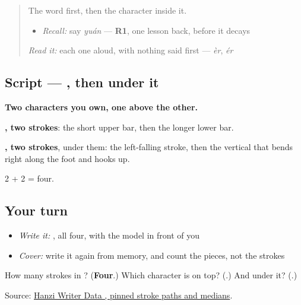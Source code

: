 \label{lesson:ZH-W156-yuan-money}



\begin{quote}
The word first, then the character inside it.

\begin{itemize}
\raggedright
  \item \emph{Recall:} say \emph{yuán} — \textbf{R1}, one lesson back, before it decays
\end{itemize}

\begin{quote}
 
\end{quote}

\emph{Read it:} each one aloud, with nothing said first — \emph{èr}, \emph{ér}
\end{quote}

\subsection*{Script — , then  under it}

\begin{quote}
\end{quote}

\textbf{Two characters you own, one above the other.}

\textbf{, two strokes}: the short upper bar, then the longer lower bar.

\textbf{, two strokes}, under them: the left-falling stroke, then the vertical that bends right along the foot and hooks up.

2 + 2 = four.

\subsection*{Your turn}
\begin{itemize}
\raggedright
  \item \emph{Write it:} , all four, with the model in front of you
  \item \emph{Cover:} write it again from memory, and count the pieces, not the strokes
\end{itemize}

\begin{tcolorbox}[breakable,colback=teal!4,colframe=teal!35!black,title={Before you move on}]
How many strokes in ? (\textbf{Four}.) Which character is on top? (\textbf{}.) And under it? (\textbf{}.)

Source: \href{https://raw.githubusercontent.com/chanind/hanzi-writer-data/68d10a4b21150cae5e1ebbd223eed289cf32d90c/data/\%E5\%85\%83.json}{Hanzi Writer Data , pinned stroke paths and medians}.
\end{tcolorbox}
